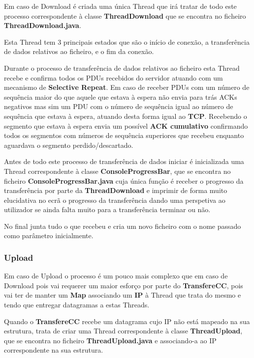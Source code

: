 \documentclass{llncs}
\begin{document}
Em caso de Download é criada uma única Thread que irá tratar de todo este processo correspondente à classe \textbf{ThreadDownload} que se encontra no ficheiro \textbf{ThreadDownload.java}.

Esta Thread tem 3 principais estados que são o início de conexão, a transferência de dados relativos ao ficheiro, e o fim da conexão.

Durante o processo de transferência de dados relativos ao ficheiro esta Thread recebe e confirma todos os PDUs recebidos do servidor atuando com um mecanismo de \textbf{Selective Repeat}. Em caso de receber PDUs com um número de sequência maior do que aquele que estava à espera não envia para trás ACKs negativos mas sim um PDU com o número de sequência igual ao número de sequência que estava à espera, atuando desta forma igual ao \textbf{TCP}. Recebendo o segmento que estava à espera envia um possível \textbf{ACK cumulativo} confirmando todos os segmentos com números de sequência superiores que recebeu enquanto aguardava o segmento perdido/descartado.

Antes de todo este processo de transferência de dados iniciar é inicializada uma Thread correspondente à classe \textbf{ConsoleProgressBar}, que se encontra no ficheiro \textbf{ConsoleProgressBar.java} cuja única função é receber o progresso da transferência por parte da \textbf{ThreadDownload} e imprimir de forma muito elucidativa no ecrã o progresso da transferência dando uma perspetiva ao utilizador se ainda falta muito para a transferência terminar ou não.

No final junta tudo o que recebeu e cria um novo ficheiro com o nome passado como parâmetro inicialmente.


\subsubsection{Upload}

Em caso de Upload o processo é um pouco mais complexo que em caso de Download pois vai requerer um maior esforço por parte do \textbf{TransfereCC}, pois vai ter de manter um \textbf{Map} associando um \textbf{IP} à Thread que trata do mesmo e tendo que entregar datagramas a estas Threads.

Quando o \textbf{TransfereCC} recebe um datagrama cujo IP não está mapeado na sua estrutura, trata de criar uma Thread correspondente à classe \textbf{ThreadUpload}, que se encontra no ficheiro \textbf{ThreadUpload.java} e associando-a ao IP correspondente na sua estrutura.
\end{document}
